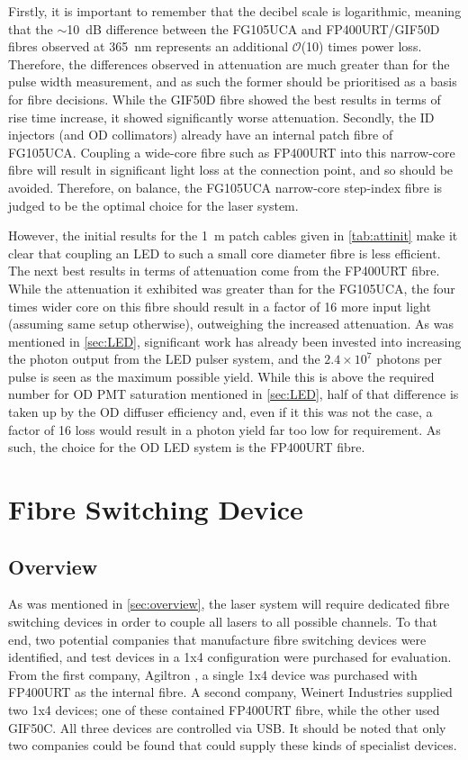 \documentclass[a4paper,11pt]{article}
\let\oldsim\sim
\renewcommand{\sim}{{\oldsim}}
\begin{document}
Firstly, it is important to remember that the decibel scale is logarithmic, meaning that the $\sim$10~dB difference between the FG105UCA and FP400URT/GIF50D fibres observed at 365~nm represents an additional $\mathcal{O}$(10) times power loss. Therefore, the differences observed in attenuation are much greater than for the pulse width measurement, and as such the former should be prioritised as a basis for fibre decisions. While the GIF50D fibre showed the best results in terms of rise time increase, it showed significantly worse attenuation. Secondly, the ID injectors (and OD collimators) already have an internal patch fibre of FG105UCA. Coupling a wide-core fibre such as FP400URT into this narrow-core fibre will result in significant light loss at the connection point, and so should be avoided. Therefore, on balance, the FG105UCA narrow-core step-index fibre is judged to be the optimal choice for the laser system.

However, the initial results for the 1~m patch cables given in \cref{tab:attinit} make it clear that coupling an LED to such a small core diameter fibre is less efficient. The next best results in terms of attenuation come from the FP400URT fibre. While the attenuation it exhibited was greater than for the FG105UCA, the four times wider core on this fibre should result in a factor of 16 more input light (assuming same setup otherwise), outweighing the increased attenuation. As was mentioned in \cref{sec:LED}, significant work has already been invested into increasing the photon output from the LED pulser system, and the $2.4\times10^7$ photons per pulse is seen as the maximum possible yield. While this is above the required number for OD PMT saturation mentioned in \cref{sec:LED}, half of that difference is taken up by the OD diffuser efficiency and, even if it this was not the case, a factor of 16 loss would result in a photon yield far too low for requirement. As such, the choice for the OD LED system is the FP400URT fibre.


\section{Fibre Switching Device}\label{sec:switch}

\subsection{Overview}
As was mentioned in \cref{sec:overview}, the laser system will require dedicated fibre switching devices in order to couple all lasers to all possible channels. To that end, two potential companies that manufacture fibre switching devices were identified, and test devices in a 1x4 configuration were purchased for evaluation. From the first company, Agiltron \cite{bib:agiltron}, a single 1x4 device was purchased with FP400URT as the internal fibre. A second company, Weinert Industries \cite{bib:weinert} supplied two 1x4 devices; one of these contained FP400URT fibre, while the other used GIF50C. All three devices are controlled via USB. It should be noted that only two companies could be found that could supply these kinds of specialist devices.
\end{document}
